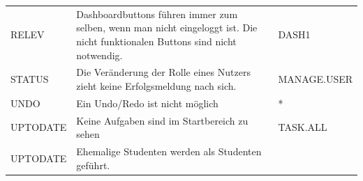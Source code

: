 \documentclass[
  12pt,
  ngerman,
  a4paper,
]{article}
\begin{document}
\begin{longtable}[]{@{}lll@{}}
\begin{minipage}[t]{0.15\columnwidth}\raggedright
RELEV\strut
\end{minipage} & \begin{minipage}[t]{0.49\columnwidth}\raggedright
Dashboardbuttons führen immer zum selben, wenn man nicht eingeloggt ist.
Die nicht funktionalen Buttons sind nicht notwendig.\strut
\end{minipage} & \begin{minipage}[t]{0.27\columnwidth}\raggedright
DASH1\strut
\end{minipage}\tabularnewline
\begin{minipage}[t]{0.15\columnwidth}\raggedright
STATUS\strut
\end{minipage} & \begin{minipage}[t]{0.49\columnwidth}\raggedright
Die Veränderung der Rolle eines Nutzers zieht keine Erfolgsmeldung nach
sich.\strut
\end{minipage} & \begin{minipage}[t]{0.27\columnwidth}\raggedright
MANAGE.USER\strut
\end{minipage}\tabularnewline
\begin{minipage}[t]{0.15\columnwidth}\raggedright
UNDO\strut
\end{minipage} & \begin{minipage}[t]{0.49\columnwidth}\raggedright
Ein Undo/Redo ist nicht möglich\strut
\end{minipage} & \begin{minipage}[t]{0.27\columnwidth}\raggedright
*\strut
\end{minipage}\tabularnewline
\begin{minipage}[t]{0.15\columnwidth}\raggedright
UPTODATE\strut
\end{minipage} & \begin{minipage}[t]{0.49\columnwidth}\raggedright
Keine Aufgaben sind im Startbereich zu sehen\strut
\end{minipage} & \begin{minipage}[t]{0.27\columnwidth}\raggedright
TASK.ALL\strut
\end{minipage}\tabularnewline
\begin{minipage}[t]{0.15\columnwidth}\raggedright
UPTODATE\strut
\end{minipage} & \begin{minipage}[t]{0.49\columnwidth}\raggedright
Ehemalige Studenten werden als Studenten geführt.\strut
\end{minipage} & \begin{minipage}[t]{0.27\columnwidth}\raggedright

\end{minipage}
\end{longtable}
\end{document}
